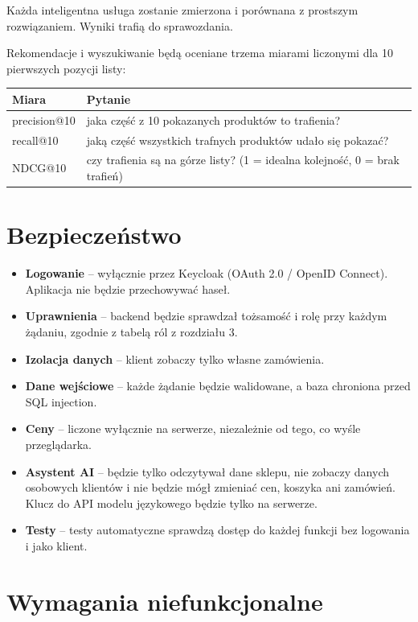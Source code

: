 \documentclass[11pt,a4paper]{article}
\begin{document}
Każda inteligentna usługa zostanie zmierzona i porównana z prostszym rozwiązaniem. Wyniki trafią do
sprawozdania.

Rekomendacje i wyszukiwanie będą oceniane trzema miarami liczonymi dla 10 pierwszych pozycji listy:

{\small
\begin{tabularx}{\textwidth}{P{3cm}L}
\toprule
\textbf{Miara} & \textbf{Pytanie} \\
\midrule
precision@10 & jaka część z 10 pokazanych produktów to trafienia? \\
recall@10 & jaką część wszystkich trafnych produktów udało się pokazać? \\
NDCG@10 & czy trafienia są na górze listy? (1 = idealna kolejność, 0 = brak trafień) \\
\bottomrule
\end{tabularx}\par\medskip
}

\section{Bezpieczeństwo}

\begin{itemize}
  \item \textbf{Logowanie} -- wyłącznie przez Keycloak (OAuth 2.0 / OpenID Connect). Aplikacja nie będzie
        przechowywać haseł.
  \item \textbf{Uprawnienia} -- backend będzie sprawdzał tożsamość i rolę przy każdym żądaniu, zgodnie
        z tabelą ról z rozdziału 3.
  \item \textbf{Izolacja danych} -- klient zobaczy tylko własne zamówienia.
  \item \textbf{Dane wejściowe} -- każde żądanie będzie walidowane, a baza chroniona przed SQL injection.
  \item \textbf{Ceny} -- liczone wyłącznie na serwerze, niezależnie od tego, co wyśle przeglądarka.
  \item \textbf{Asystent AI} -- będzie tylko odczytywał dane sklepu, nie zobaczy danych osobowych klientów
        i nie będzie mógł zmieniać cen, koszyka ani zamówień. Klucz do API modelu językowego będzie tylko
        na serwerze.
  \item \textbf{Testy} -- testy automatyczne sprawdzą dostęp do każdej funkcji bez logowania
        i jako klient.
\end{itemize}

\section{Wymagania niefunkcjonalne}
\end{document}
